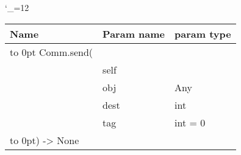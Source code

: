 \begingroup \catcode`\_=12 \tt
\begin{tabular}{lll}
\toprule
\textrm{Name}&\textrm{Param name}&\textrm{param type}\\
\midrule
\hbox to 0pt {Comm.send(\hss}\\
& self\\
& obj & Any\\
& dest & int\\
& tag & int = 0\\
\hbox to 0pt{) -> None\hss}\\
\bottomrule
\end{tabular}
\endgroup
